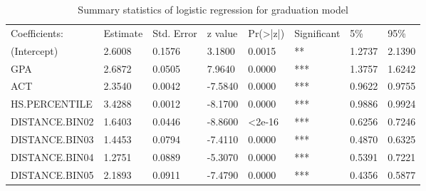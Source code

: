 \documentclass[12pt,english]{report}
\begin{document}
\begin{table}[H]
\centering
\caption{Summary statistics of logistic regression for graduation model}
\label{lr_summary2}
\begin{adjustbox}{width=0.95\textwidth}
\begin{tabular}{|llllllll|} \hline %
Coefficients:                   & Estimate & Std. Error & z value & Pr(\textgreater|z|) & Significant & 5\%    & 95\%   \\
(Intercept)                     & 2.6008   & 0.1576     & 3.1800  & 0.0015      & **          & 1.2737 & 2.1390 \\
GPA                             & 2.6872   & 0.0505     & 7.9640  & 0.0000      & ***         & 1.3757 & 1.6242 \\
ACT                             & 2.3540   & 0.0042     & -7.5840 & 0.0000      & ***         & 0.9622 & 0.9755 \\
HS.PERCENTILE                   & 3.4288   & 0.0012     & -8.1700 & 0.0000      & ***         & 0.9886 & 0.9924 \\
DISTANCE.BIN02                  & 1.6403   & 0.0446     & -8.8600 & \textless2e-16     & ***         & 0.6256 & 0.7246 \\
DISTANCE.BIN03                  & 1.4453   & 0.0794     & -7.4110 & 0.0000     & ***         & 0.4870 & 0.6325 \\
DISTANCE.BIN04                  & 1.2751   & 0.0889     & -5.3070 & 0.0000     & ***         & 0.5391 & 0.7221 \\
DISTANCE.BIN05                  & 2.1893   & 0.0911     & -7.4790 & 0.0000     & ***         & 0.4356 & 0.5877 \\

\end{tabular}
\end{adjustbox}
\end{table}
\end{document}
